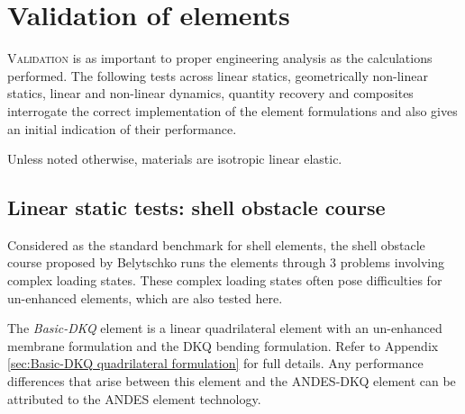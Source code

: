 




\chapter{Validation of elements}

\renewcommand{\Thema}{Validation of elements}

\lettrine[lines=2]{V}{alidation} is as important to proper engineering analysis as the calculations performed. The following tests across linear statics, geometrically non-linear statics, linear and non-linear dynamics, quantity recovery and composites interrogate the correct implementation of the element formulations and also gives an initial indication of their performance. 

Unless noted otherwise, materials are isotropic linear elastic.

\section{Linear static tests: shell obstacle course}
\label{section:shell obstacle course}

Considered as the standard benchmark for shell elements, the shell obstacle course proposed by Belytschko \cite{Bel85} runs the elements through 3 problems involving complex loading states. These complex loading states often pose difficulties for un-enhanced elements, which are also tested here.

The \textit{Basic-DKQ} element is a linear quadrilateral element with an un-enhanced membrane formulation and the DKQ bending formulation. Refer to Appendix \ref{sec:Basic-DKQ quadrilateral formulation} for full details. Any performance differences that arise between this element and the ANDES-DKQ element can be attributed to the ANDES element technology.

